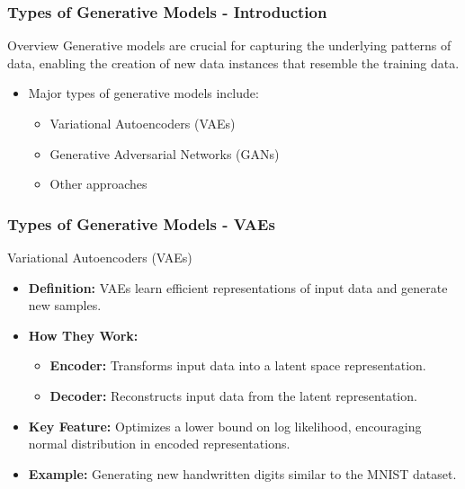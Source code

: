 \documentclass[aspectratio=169]{beamer}
\begin{document}
\begin{frame}[fragile]
    \frametitle{Types of Generative Models - Introduction}
    \begin{block}{Overview}
        Generative models are crucial for capturing the underlying patterns of data, enabling the creation of new data instances that resemble the training data.
    \end{block}
    \begin{itemize}
        \item Major types of generative models include:
        \begin{itemize}
            \item Variational Autoencoders (VAEs)
            \item Generative Adversarial Networks (GANs)
            \item Other approaches
        \end{itemize}
    \end{itemize}
\end{frame}

\begin{frame}[fragile]
    \frametitle{Types of Generative Models - VAEs}
    \begin{block}{Variational Autoencoders (VAEs)}
        \begin{itemize}
            \item \textbf{Definition:} VAEs learn efficient representations of input data and generate new samples.
            \item \textbf{How They Work:}
            \begin{itemize}
                \item \textbf{Encoder:} Transforms input data into a latent space representation.
                \item \textbf{Decoder:} Reconstructs input data from the latent representation.
            \end{itemize}
            \item \textbf{Key Feature:} Optimizes a lower bound on log likelihood, encouraging normal distribution in encoded representations.
            \item \textbf{Example:} Generating new handwritten digits similar to the MNIST dataset.
        \end{itemize}
    \end{block}
\end{frame}
\end{document}
